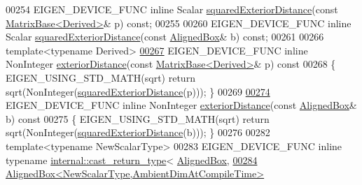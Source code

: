 \begin{DoxyCode}
00254   EIGEN\_DEVICE\_FUNC \textcolor{keyword}{inline} Scalar \hyperlink{group___geometry___module_aa6d9ffc81bd77da631fef6559f45cf13}{squaredExteriorDistance}(\textcolor{keyword}{const} 
      \hyperlink{group___core___module_class_eigen_1_1_matrix_base}{MatrixBase<Derived>}& p) \textcolor{keyword}{const};
00255 
00260   EIGEN\_DEVICE\_FUNC \textcolor{keyword}{inline} Scalar \hyperlink{group___geometry___module_aa6d9ffc81bd77da631fef6559f45cf13}{squaredExteriorDistance}(\textcolor{keyword}{const} 
      \hyperlink{group___geometry___module_class_eigen_1_1_aligned_box}{AlignedBox}& b) \textcolor{keyword}{const};
00261 
00266   \textcolor{keyword}{template}<\textcolor{keyword}{typename} Derived>
\hyperlink{group___geometry___module_afe02b2ef5cdc1e1cd45eddee33cf1be5}{00267}   EIGEN\_DEVICE\_FUNC \textcolor{keyword}{inline} NonInteger \hyperlink{group___geometry___module_afe02b2ef5cdc1e1cd45eddee33cf1be5}{exteriorDistance}(\textcolor{keyword}{const} 
      \hyperlink{group___core___module_class_eigen_1_1_matrix_base}{MatrixBase<Derived>}& p)\textcolor{keyword}{ const}
00268 \textcolor{keyword}{  }\{ EIGEN\_USING\_STD\_MATH(sqrt) \textcolor{keywordflow}{return} sqrt(NonInteger(\hyperlink{group___geometry___module_aa6d9ffc81bd77da631fef6559f45cf13}{squaredExteriorDistance}(p))); 
      \}
00269 
\hyperlink{group___geometry___module_adf8c0e000b283ad22f00474356916686}{00274}   EIGEN\_DEVICE\_FUNC \textcolor{keyword}{inline} NonInteger \hyperlink{group___geometry___module_adf8c0e000b283ad22f00474356916686}{exteriorDistance}(\textcolor{keyword}{const} 
      \hyperlink{group___geometry___module_class_eigen_1_1_aligned_box}{AlignedBox}& b)\textcolor{keyword}{ const}
00275 \textcolor{keyword}{  }\{ EIGEN\_USING\_STD\_MATH(sqrt) \textcolor{keywordflow}{return} sqrt(NonInteger(\hyperlink{group___geometry___module_aa6d9ffc81bd77da631fef6559f45cf13}{squaredExteriorDistance}(b))); 
      \}
00276 
00282   \textcolor{keyword}{template}<\textcolor{keyword}{typename} NewScalarType>
00283   EIGEN\_DEVICE\_FUNC \textcolor{keyword}{inline} \textcolor{keyword}{typename} \hyperlink{struct_eigen_1_1internal_1_1cast__return__type}{internal::cast\_return\_type}<
      \hyperlink{group___geometry___module_aeb7682d3d8676752e9b789b51d950872}{AlignedBox},
\hyperlink{group___geometry___module_a269eb719d3e093d9c1cb4309b815c51b}{00284}            \hyperlink{group___geometry___module_class_eigen_1_1_aligned_box}{AlignedBox<NewScalarType,AmbientDimAtCompileTime>}

\end{DoxyCode}
